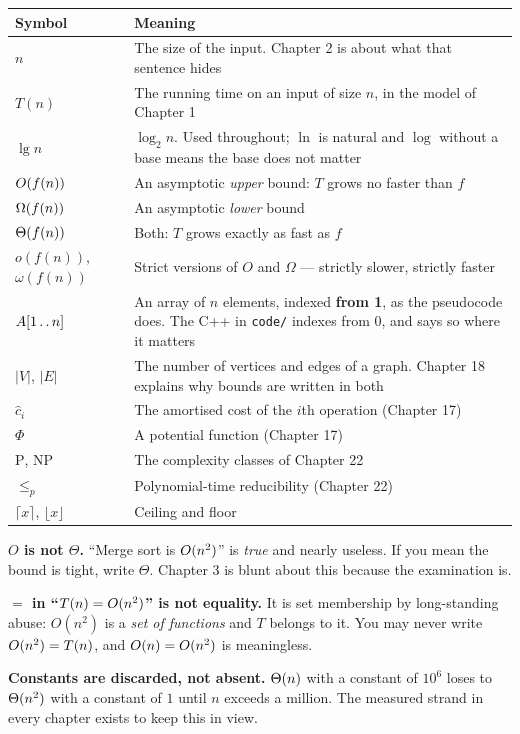 \begin{longtable}{@{}L{3.0cm}L{12.2cm}@{}}
\toprule
{}
\textbf{Symbol} & \textbf{Meaning} \\
\midrule
\endhead
$n$ & The size of the input. Chapter 2 is about what that sentence hides \\
$T(n)$ & The running time on an input of size $n$, in the model of Chapter 1 \\
$\lg n$ & $\log_2 n$. Used throughout; $\ln$ is natural and $\log$ without a
base means the base does not matter \\
$O(f(n))$ & An asymptotic \emph{upper} bound: $T$ grows no faster than $f$ \\
$\Omega(f(n))$ & An asymptotic \emph{lower} bound \\
$\Theta(f(n))$ & Both: $T$ grows exactly as fast as $f$ \\
$o(f(n))$, $\omega(f(n))$ & Strict versions of $O$ and $\Omega$ --- strictly
slower, strictly faster \\
$A[1 \mathinner{\ldotp\ldotp} n]$ & An array of $n$ elements, indexed
\textbf{from 1}, as the pseudocode does. The C++ in \texttt{code/} indexes from
0, and says so where it matters \\
$|V|$, $|E|$ & The number of vertices and edges of a graph. Chapter 18 explains
why bounds are written in both \\
$\hat{c}_i$ & The amortised cost of the $i$th operation (Chapter 17) \\
$\Phi$ & A potential function (Chapter 17) \\
$\mathrm{P}$, $\mathrm{NP}$ & The complexity classes of Chapter 22 \\
$\le_p$ & Polynomial-time reducibility (Chapter 22) \\
$\lceil x \rceil$, $\lfloor x \rfloor$ & Ceiling and floor \\
\bottomrule
\end{longtable}

\begin{alertbox}
\textbf{$O$ is not $\Theta$.} ``Merge sort is $O(n^2)$'' is \emph{true} and
nearly useless. If you mean the bound is tight, write $\Theta$. Chapter 3 is
blunt about this because the examination is.

\smallskip
\textbf{$=$ in ``$T(n) = O(n^2)$'' is not equality.} It is set membership
by long-standing abuse: $O(n^2)$ is a \emph{set of functions} and $T$ belongs
to it. You may never write $O(n^2) = T(n)$, and $O(n) = O(n^2)$ is
meaningless.

\smallskip
\textbf{Constants are discarded, not absent.} $\Theta(n)$ with a constant of
$10^6$ loses to $\Theta(n^2)$ with a constant of $1$ until $n$ exceeds a
million. The measured strand in every chapter exists to keep this in view.
\end{alertbox}

